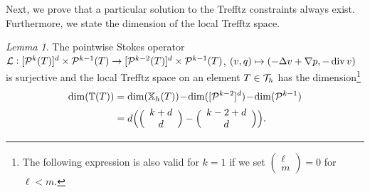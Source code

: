 \documentclass[pdflatex,sn-mathphys,Numbered]{sn-jnl}%
\theoremstyle{remark}%
\newtheorem{lemma}[theorem]{Lemma}
\theoremstyle{definition}%
\begin{document}
Next, we prove that a particular solution to the Trefftz constraints
always exist. Furthermore, we state the dimension of the local Trefftz
space.
\begin{lemma} \label{lem:surj} The pointwise Stokes operator $\mathcal{L} :
 [\mathcal{P}^{k}(T)]^d \times \mathcal{P}^{k-1}(T) \to [\mathcal{P}^{k-2}(T)]^d \times
 \mathcal{P}^{k-1}(T)$, $(v,q) \mapsto (-\Delta v + \nabla p, - \operatorname{\mathrm{div}} v)$ is
 surjective and the local Trefftz space on an element $T\in{\mathcal{T}_h}$ has
 the dimension\footnote{
  The following expression is also valid for $k=1$ 
  if we set
   $\left(\begin{array}{c} \ell \\ m \end{array} \right) = 0$ for $\ell < m$. 
 }
\begin{align} \label{eq:dimTT}
\dim( \mathbb{T}(T)) & = 
\dim(\mathbb{X}_h(T)) \!-\! \dim([\mathcal{P}^{k-2}]^d) \!-\! \dim(\mathcal{P}^{k-1})
\\ & =
d \Big(  \Big( \begin{array}{c} k + d \\ d \end{array} \Big) - \Big( \begin{array}{c} k- 2 + d \\ d \end{array} \Big)  \Big). \nonumber
\end{align}
\end{lemma}
\end{document}
